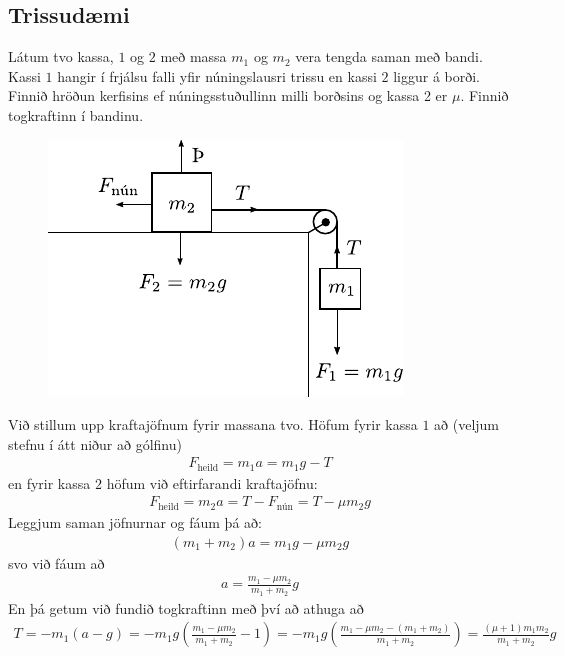 \ifdefined \wholebook \else\documentclass[oneside]{book}\usepackage{EdlBook}\graphicspath{{figures/}}
\begin{document}
\subsection*{Trissudæmi}

Látum tvo kassa, $1$ og $2$ með massa $m_1$ og $m_2$ vera tengda saman með bandi. Kassi $1$ hangir í frjálsu falli yfir núningslausri trissu en kassi $2$ liggur á borði. Finnið hröðun kerfisins ef núningsstuðullinn milli borðsins og kassa 2 er $\mu$. Finnið togkraftinn í bandinu.

\begin{figure}[H]
    \centering
    \includegraphics{figures/trissudaemi.pdf}
\end{figure}

Við stillum upp kraftajöfnum fyrir massana tvo. Höfum fyrir kassa $1$ að (veljum stefnu í átt niður að gólfinu)
\begin{align*} 
F_{\text{heild}} = m_1a = m_1g - T
\end{align*}
en fyrir kassa $2$ höfum við eftirfarandi kraftajöfnu:
\begin{align*}
    F_{\text{heild}} = m_2a = T - F_{\text{nún}} = T - \mu m_2 g
\end{align*}
Leggjum saman jöfnurnar og fáum þá að:
\begin{align*}
    (m_1 + m_2)a = m_1g - \mu m_2 g
\end{align*}
svo við fáum að
\begin{align*}
    a = \frac{m_1-\mu m_2}{m_1 + m_2}g
\end{align*}
En þá getum við fundið togkraftinn með því að athuga að
\begin{align*}
    T = -m_1(a-g) = -m_1 g \left( \frac{m_1-\mu m_2}{m_1 + m_2} - 1 \right) = -m_1 g \left( \frac{m_1 - \mu m_2 - \left( m_1 + m_2 \right)}{m_1 + m_2} \right) = \frac{(\mu +1)m_1 m_2}{m_1 + m_2}g
\end{align*}
\end{document}
